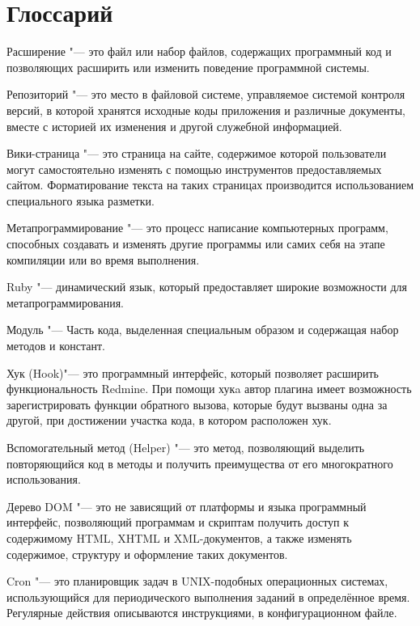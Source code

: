 \appendix

\makeatletter
\gdef\thechapter{\@Asbuk\c@chapter}
\makeatother

\chapter{Глоссарий}
\label{glossary}
Расширение "--- это файл или набор файлов, содержащих программный код и
позволяющих расширить или изменить поведение программной системы.

Репозиторий "--- это место в файловой системе, управляемое системой контроля
версий, в которой хранятся исходные коды приложения и различные документы,
вместе с историей их изменения и другой служебной информацией.

Вики-страница "--- это страница на сайте, содержимое которой пользователи могут
самостоятельно изменять с помощью инструментов предоставляемых сайтом.
Форматирование текста на таких страницах производится использованием
специального языка разметки.

Метапрограммирование "--- это процесс написание компьютерных программ,
способных создавать и изменять другие программы или самих себя на этапе
компиляции или во время выполнения.

Ruby "--- динамический язык, который предоставляет широкие возможности для
метапрограммирования.

Модуль "--- Часть кода, выделенная специальным образом и содержащая набор
методов и констант.

Хук (Hook)"--- это программный интерфейс, который позволяет расширить
функциональность Redmine. При помощи хукa автор плагина имеет возможность
зарегистрировать функции обратного вызова, которые будут вызваны одна за
другой, при достижении участка кода, в котором расположен хук.

Вспомогательный метод (Helper) "--- это  метод, позволяющий выделить
повторяющийся код в методы и получить преимущества от его многократного
использования.

Дерево DOM "---  это не зависящий от платформы и языка программный интерфейс,
позволяющий программам и скриптам получить доступ к содержимому HTML, XHTML и
XML-документов, а также изменять содержимое, структуру и оформление таких
документов.

Cron "--- это планировщик задач в UNIX-подобных операционных системах,
использующийся для периодического выполнения заданий в определённое время.
Регулярные действия описываются инструкциями, в конфигурационном файле.

